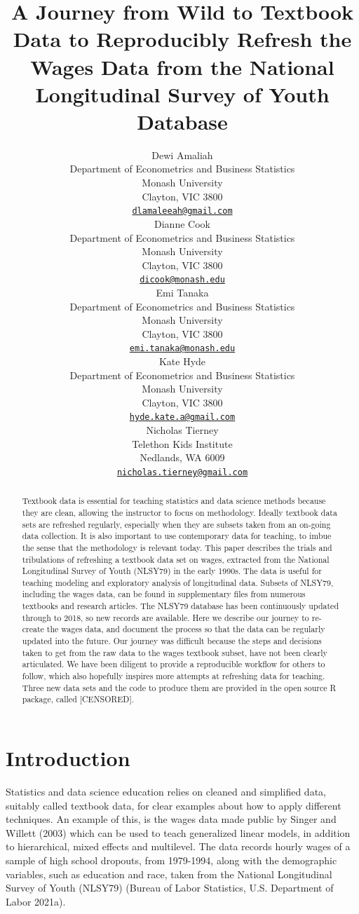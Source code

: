 \documentclass{article}
\title{A Journey from Wild to Textbook Data to Reproducibly Refresh the Wages Data from the National Longitudinal Survey of Youth Database}
\author{
    Dewi Amaliah
   \\
    Department of Econometrics and Business Statistics \\
    Monash University \\
  Clayton, VIC 3800 \\
  \texttt{\href{mailto:dlamaleeah@gmail.com}{\nolinkurl{dlamaleeah@gmail.com}}} \\
   \And
    Dianne Cook
   \\
    Department of Econometrics and Business Statistics \\
    Monash University \\
  Clayton, VIC 3800 \\
  \texttt{\href{mailto:dicook@monash.edu}{\nolinkurl{dicook@monash.edu}}} \\
   \And
    Emi Tanaka
   \\
    Department of Econometrics and Business Statistics \\
    Monash University \\
  Clayton, VIC 3800 \\
  \texttt{\href{mailto:emi.tanaka@monash.edu}{\nolinkurl{emi.tanaka@monash.edu}}} \\
   \And
    Kate Hyde
   \\
    Department of Econometrics and Business Statistics \\
    Monash University \\
  Clayton, VIC 3800 \\
  \texttt{\href{mailto:hyde.kate.a@gmail.com}{\nolinkurl{hyde.kate.a@gmail.com}}} \\
   \And
    Nicholas Tierney
   \\
    Telethon Kids Institute \\
  Nedlands, WA 6009 \\
  \texttt{\href{mailto:nicholas.tierney@gmail.com}{\nolinkurl{nicholas.tierney@gmail.com}}} \\
  }
\begin{document}
\maketitle

\def\tightlist{}


\begin{abstract}
Textbook data is essential for teaching statistics and data science methods because they are clean, allowing the instructor to focus on methodology. Ideally textbook data sets are refreshed regularly, especially when they are subsets taken from an on-going data collection. It is also important to use contemporary data for teaching, to imbue the sense that the methodology is relevant today. This paper describes the trials and tribulations of refreshing a textbook data set on wages, extracted from the National Longitudinal Survey of Youth (NLSY79) in the early 1990s. The data is useful for teaching modeling and exploratory analysis of longitudinal data. Subsets of NLSY79, including the wages data, can be found in supplementary files from numerous textbooks and research articles. The NLSY79 database has been continuously updated through to 2018, so new records are available. Here we describe our journey to re-create the wages data, and document the process so that the data can be regularly updated into the future. Our journey was difficult because the steps and decisions taken to get from the raw data to the wages textbook subset, have not been clearly articulated. We have been diligent to provide a reproducible workflow for others to follow, which also hopefully inspires more attempts at refreshing data for teaching. Three new data sets and the code to produce them are provided in the open source R package, called {[}CENSORED{]}.
\end{abstract}


\hypertarget{intro}{%
\section{Introduction}\label{intro}}

Statistics and data science education relies on cleaned and simplified data, suitably called textbook data, for clear examples about how to apply different techniques. An example of this, is the wages data made public by Singer and Willett (2003) which can be used to teach generalized linear models, in addition to hierarchical, mixed effects and multilevel. The data records hourly wages of a sample of high school dropouts, from 1979-1994, along with the demographic variables, such as education and race, taken from the National Longitudinal Survey of Youth (NLSY79) (Bureau of Labor Statistics, U.S. Department of Labor 2021a).
\end{document}
